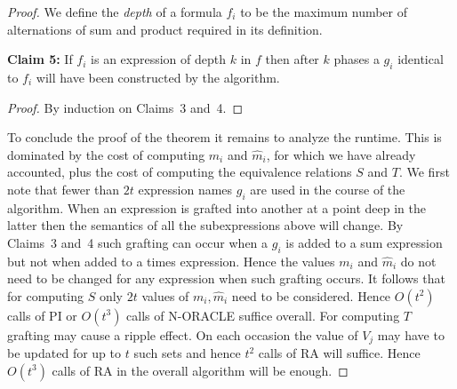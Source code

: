 \begin{proof}
We define the \emph{depth} of a formula $f_i$ to be the maximum number of alternations of sum and product required in its definition.

\textbf{Claim 5:} If $f_i$ is an expression of depth $k$ in $f$ then after $k$ phases a $g_i$ identical to $f_i$ will have been constructed by the algorithm.

\begin{proof}
By induction on Claims~3 and~4. \qedhere
\end{proof}

To conclude the proof of the theorem it remains to analyze the runtime. This is dominated by the cost of computing $m_i$ and $\hat{m}_i$, for which we have already accounted, plus the cost of computing the equivalence relations $S$ and $T$. We first note that fewer than $2t$ expression names $g_i$ are used in the course of the algorithm. When an expression is grafted into another at a point deep in the latter then the semantics of all the subexpressions above will change. By Claims~3 and~4 such grafting can occur when a $g_i$ is added to a sum expression but not when added to a times expression. Hence the values $m_i$ and $\hat{m}_i$ do not need to be changed for any expression when such grafting occurs. It follows that for computing $S$ only $2t$ values of $m_i, \hat{m}_i$ need to be considered. Hence $O(t^2)$ calls of PI or $O(t^3)$ calls of N-ORACLE suffice overall. For computing $T$ grafting may cause a ripple effect. On each occasion the value of $V_j$ may have to be updated for up to $t$ such sets and hence $t^2$ calls of RA will suffice. Hence $O(t^3)$ calls of RA in the overall algorithm will be enough.
\end{proof}
